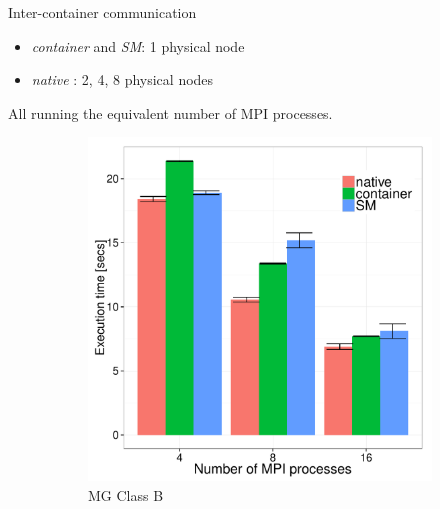 \documentclass[presentation]{beamer}
\begin{document}
\begin{frame}[label=sec-3-5]{Inter-container communication}
\begin{itemize}
\item \emph{container} and \emph{SM}: 1 physical node
\item \emph{native} : 2, 4, 8 physical nodes
\end{itemize}

All running the equivalent number of MPI processes.

\begin{figure}[H]
  \centering
\begin{subfigure}[b]{0.42\textwidth}
    \includegraphics[scale=0.25,angle=0]{figures/inter-container-mgC.pdf}
    \caption{MG Class B}
  \end{subfigure}
  \begin{subfigure}[b]{0.42\textwidth}

\end{subfigure}
\end{figure}
\end{frame}
\end{document}
